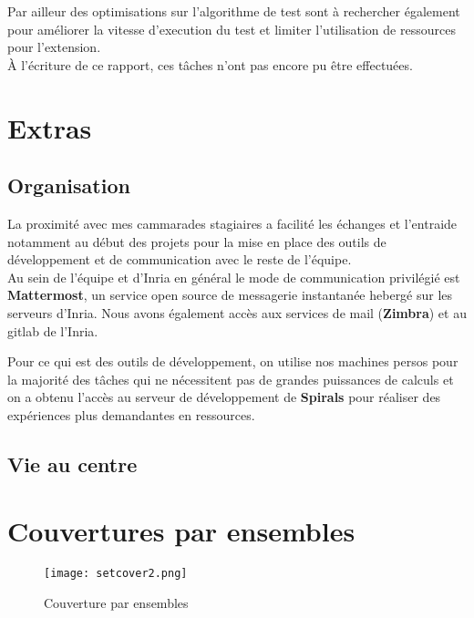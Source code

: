 \documentclass[oneside,a4paper,12pt]{article}
\begin{document}
Par ailleur des optimisations sur l'algorithme de test sont à rechercher également pour améliorer la vitesse d'execution du test et limiter l'utilisation de ressources pour l'extension.\\

\`A l'écriture de ce rapport, ces tâches n'ont pas encore pu être effectuées.

\section{Extras}

\subsection{Organisation}

La proximité avec mes cammarades stagiaires a facilité les échanges et l'entraide notamment au début des projets pour la mise en place des outils de développement et de communication avec le reste de l'équipe.\\

Au sein de l'équipe et d'Inria en général le mode de communication privilégié est \textbf{Mattermost}, un service open source de messagerie instantanée hebergé sur les serveurs d'Inria. Nous avons également accès aux services de mail (\textbf{Zimbra}) et au gitlab de l'Inria.

Pour ce qui est des outils de développement, on utilise nos machines persos pour la majorité des tâches qui ne nécessitent pas de grandes puissances de calculs et on a obtenu l'accès au serveur de développement de \textbf{Spirals} pour réaliser des expériences plus demandantes en ressources.

\subsection{Vie au centre}

\newpage

\appendix

\section{Couvertures par ensembles}\label{setcover}

\begin{figure}[h]
	\centering
	\texttt{[image: setcover2.png]}
	\caption{Couverture par ensembles}
\end{figure}
\end{document}
